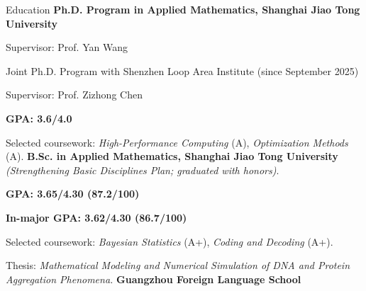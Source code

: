 \begin{rubric}{Education}
\entry*[2024 -- Present]%
	\textbf{Ph.D. Program in Applied Mathematics, Shanghai Jiao Tong University}
	\par Supervisor: Prof. Yan Wang
	\par Joint Ph.D. Program with Shenzhen Loop Area Institute (since September 2025)
	\par Supervisor: Prof. Zizhong Chen
	\par \textbf{GPA: 3.6/4.0}
    \par Selected coursework: \emph{High-Performance Computing} (A), \emph{Optimization Methods} (A).
\entry*[2020 -- 2024]%
	\textbf{B.Sc. in Applied Mathematics, Shanghai Jiao Tong University}
	\textit{ (Strengthening Basic Disciplines Plan; graduated with honors)}.
	\par \textbf{GPA: 3.65/4.30 \quad (87.2/100)}
	\par \textbf{In-major GPA: 3.62/4.30 \quad (86.7/100)}
    \par Selected coursework: \emph{Bayesian Statistics} (A+), \emph{Coding and Decoding} (A+).
	\par Thesis: \emph{Mathematical Modeling and Numerical Simulation of DNA and Protein Aggregation Phenomena.}
\entry*[2014 -- 2020]%
	\textbf{Guangzhou Foreign Language School}\par
\end{rubric}
